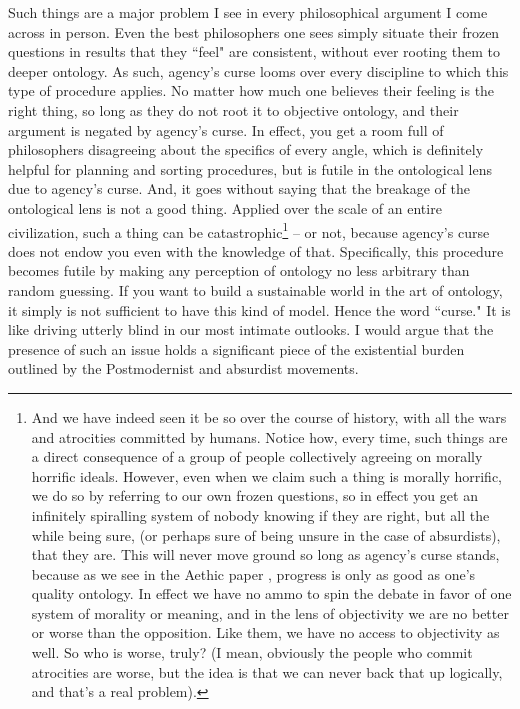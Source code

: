 Such things are a major problem I see in every philosophical argument I come across in person. Even the best philosophers one sees simply situate their frozen questions in results that they ``feel" are consistent, without ever rooting them to deeper ontology. As such, agency's curse looms over every discipline to which this type of procedure applies. No matter how much one believes their feeling is the right thing, so long as they do not root it to objective ontology, and their argument is negated by agency's curse. In effect, you get a room full of philosophers disagreeing about the specifics of every angle, which is definitely helpful for planning and sorting procedures, but is futile in the ontological lens due to agency's curse. And, it goes without saying that the breakage of the ontological lens is not a good thing. Applied over the scale of an entire civilization, such a thing can be catastrophic\footnote{And we have indeed seen it be so over the course of history, with all the wars and atrocities committed by humans. Notice how, every time, such things are a direct consequence of a group of people collectively agreeing on morally horrific ideals. However, even when we claim such a thing is morally horrific, we do so by referring to our own frozen questions, so in effect you get an infinitely spiralling system of nobody knowing if they are right, but all the while being sure, (or perhaps sure of being unsure in the case of absurdists), that they are. This will never move ground so long as agency's curse stands, because as we see in the Aethic paper \cite{Aethus}, progress is only as good as one's quality ontology. In effect we have no ammo to spin the debate in favor of one system of morality or meaning, and in the lens of objectivity we are no better or worse than the opposition. Like them, we have no access to objectivity as well. So who is worse, truly? (I mean, obviously the people who commit atrocities are worse, but the idea is that we can never back that up logically, and that's a real problem).} -- or not, because agency's curse does not endow you even with the knowledge of that. Specifically, this procedure becomes futile by making any perception of ontology no less arbitrary than random guessing. If you want to build a sustainable world in the art of ontology, it simply is not sufficient to have this kind of model. Hence the word ``curse." It is like driving utterly blind in our most intimate outlooks. I would argue that the presence of such an issue holds a significant piece of the existential burden outlined by the Postmodernist and absurdist movements. 

